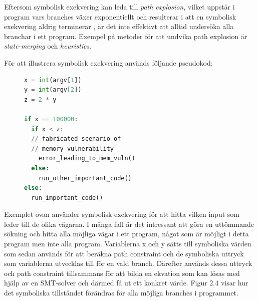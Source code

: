 Eftersom symbolisk exekvering kan leda till \emph{path explosion}, vilket
uppstår i program vars branches växer exponentiellt och resulterar i att en
symbolisk exekvering aldrig terminerar \cite{path_explo}, är det inte effektivt 
att alltid undersöka alla branchar i ett program. Exempel på metoder för att undvika 
path explosion är \emph{state-merging} och \emph{heuristics}. 

För att illustrera symbolisk exekvering används följande pseudokod:

\begin{figure}[H]
\centering
\begin{lstlisting}[label={list:first}, language=Python, frame=single]
x = int(argv[1])
y = int(argv[2])
z = 2 * y

if x == 100000: 
  if x < z:
  // fabricated scenario of 
  // memory vulnerability
    error_leading_to_mem_vuln()
  else:
    run_other_important_code()
else:
  run_important_code()

\end{lstlisting}
\caption{}
\end{figure}

Exemplet ovan använder symbolisk exekvering för att hitta vilken input som leder
till de olika vägarna. I många fall är det intressant att göra en uttömmande
sökning och hitta alla möjliga vägar i ett program, något som är möjligt i detta
program men inte alla program. Variablerna x och y sätts till symboliska
värden som sedan används för att beräkna path constraint och de symboliska
uttryck som variablerna utvecklas till för en vald branch. Därefter används
dessa uttryck och path constraint tillsammans för att bilda en ekvation som kan
lösas med hjälp av en SMT-solver och därmed få ut ett konkret värde. Figur 2.4
visar hur det symboliska tillståndet förändras för alla möjliga branches i
programmet.

